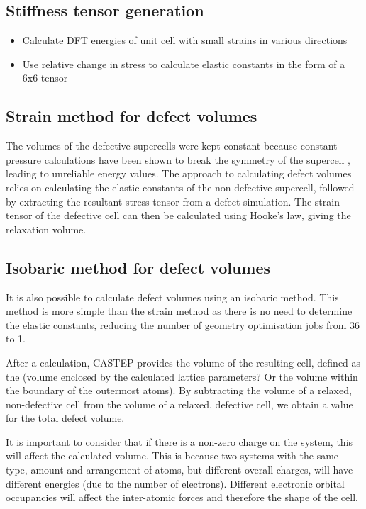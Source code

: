 \subsection{Stiffness tensor generation}

\begin{itemize}
\item Calculate DFT energies of unit cell with small strains in various directions
\item Use relative change in stress to calculate elastic constants in the form of a 6x6 tensor
\end{itemize}

\subsection{Strain method for defect volumes}

The volumes of the defective supercells were kept constant because constant pressure calculations have been shown to break the symmetry of the supercell \cite{samanta2010thermodynamic}, leading to unreliable energy values. The approach to calculating defect volumes relies on calculating the elastic constants of the non-defective supercell, followed by extracting the resultant stress tensor from a defect simulation. The strain tensor of the defective cell can then be calculated using Hooke's law, giving the relaxation volume. 

\subsection{Isobaric method for defect volumes}

It is also possible to calculate defect volumes using an isobaric method. This method is more simple than the strain method as there is no need to determine the elastic constants, reducing the number of geometry optimisation jobs from 36 to 1. 

After a calculation, CASTEP provides the volume of the resulting cell, defined as the (volume enclosed by the calculated lattice parameters? Or the volume within the boundary of the outermost atoms). By subtracting the volume of a relaxed, non-defective cell from the volume of a relaxed, defective cell, we obtain a value for the total defect volume.

It is important to consider that if there is a non-zero charge on the system, this will affect the calculated volume. This is because two systems with the same type, amount and arrangement of atoms, but different overall charges, will have different energies (due to the number of electrons). Different electronic orbital occupancies will affect the inter-atomic forces and therefore the shape of the cell. 

